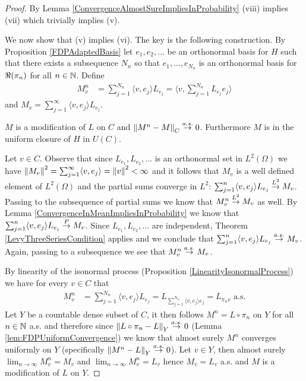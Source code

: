 \begin{proof}
By Lemma \ref{ConvergenceAlmostSureImpliesInProbability} (viii) implies (vii) which trivially implies (v).  

We now show that (v) implies (vi).  The key is the following construction.   By Proposition \ref{FDPAdaptedBasis} let $e_1, e_2, \dotsc$ be an orthonormal basis for $H$ such that there exists a subsequence $N_n$ so that $e_1, \dotsc, e_{N_n}$ is an orthonormal basis for $\Re(\pi_n)$ for all $n \in \mathbb{N}$.
Define 
\begin{align*}
M^n_v &= \sum_{j=1}^{N_n} \langle v, e_j \rangle L_{e_j} = \langle v, \sum_{j=1}^{N_n} L_{e_j} e_j \rangle
\end{align*} 
and $M_v = \sum_{j=1}^\infty \langle v, e_j \rangle L_{e_j}$. 

\begin{clm}\label{clm:PrelinearModification} $M$ is a modification of $L$ on $C$ and $\left \lVert M^n - M \right \rVert_C \overset{a.s.}\to 0$.  Furthermore $M$ is in the uniform closure of $H$ in $U(C)$.
\end{clm}
Let $v \in C$. Observe that since $L_{e_1}, L_{e_2}, \dotsc$ is an orthonormal set in $L^2(\Omega)$ we have $\left \lVert M_v \right \rVert^2 = \sum_{j=1}^\infty \langle v, e_j \rangle = \left \lVert v \right \rVert^2 < \infty$ and it follows that $M_v$ is a well defined element of $L^2(\Omega)$ and the partial sums converge in $L^2$: $\sum_{j=1}^n \langle v, e_j \rangle  L_{e_j} \overset{L^2}\to M_v$.  Passing to the subsequence of partial sums we know that $M^n_v \overset{L^2}\to M_v$ as well.  By Lemma \ref{ConvergenceInMeanImpliesInProbability} we know that $\sum_{j=1}^n \langle v, e_j \rangle  L_{e_j} \overset{P}\to M_v$.  Since $L_{e_1}, L_{e_2}, \dotsc$ are independent, Theorem \ref{LevyThreeSeriesCondition} applies and we conclude that $\sum_{j=1}^n \langle v, e_j \rangle  L_{e_j} \overset{a.s.}\to M_v$.  Again, passing to a subsequence we see that $M^n_v \overset{a.s.}\to M_v$.

By linearity of the isonormal process (Proposition \ref{LinearityIsonormalProcess}) we have for every $v \in C$ that 
\begin{align*}
M^n_v &= \sum_{j=1}^{N_n} \langle v, e_j \rangle L_{e_j} =  L_{\sum_{j=1}^{N_n}  \langle v, e_j \rangle e_j} = L_{\pi_n v} \text{ a.s.}
\end{align*}
Let $Y$ be a countable dense subset of $C$, it then follows $M^n = L \circ \pi_n$ on $Y$ for all $n \in \mathbb{N}$ a.s. and therefore since $\left \lVert L \circ \pi_n - L \right \rVert_Y \overset{a.s.}\to 0$ (Lemma \ref{lem:FDPUniformConvergence}) we know that almost surely $M^n$ converges uniformly on $Y$ (specifically $\left \lVert M^n - L \right \rVert_Y \overset{a.s.}\to 0$).  
Let $v \in Y$, then almost surely $\lim_{n \to \infty} M^n_v = M_v$ and $\lim_{n \to \infty} M^n_v = L_v$ hence $M_v = L_v$ a.s. and $M$ is a modification of $L$ on $Y$.  


\end{proof}
